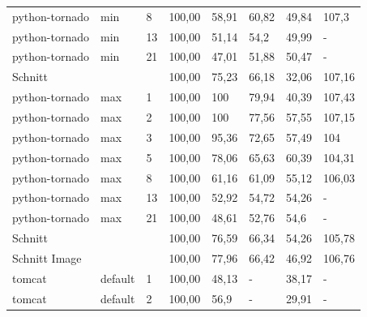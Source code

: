 \begin{footnotesize}
\begin{longtable}{llllllll}
		python-tornado & min     & 8          & 100,00 & 58,91                       & 60,82                          & 49,84  & 107,3  \\
		python-tornado & min     & 13         & 100,00 & 51,14                       & 54,2                           & 49,99  & -      \\
		python-tornado & min     & 21         & 100,00 & 47,01                       & 51,88                          & 50,47  & -      \\ \hline
		Schnitt        &         &            & 100,00 & 75,23                       & 66,18                          & 32,06  & 107,16 \\ \hline
		python-tornado & max     & 1          & 100,00 & \cellcolor[HTML]{C0C0C0}100 & 79,94                          & 40,39  & 107,43 \\
		python-tornado & max     & 2          & 100,00 & \cellcolor[HTML]{C0C0C0}100 & 77,56                          & 57,55  & 107,15 \\
		python-tornado & max     & 3          & 100,00 & 95,36                       & 72,65                          & 57,49  & 104    \\
		python-tornado & max     & 5          & 100,00 & 78,06                       & 65,63                          & 60,39  & 104,31 \\
		python-tornado & max     & 8          & 100,00 & 61,16                       & 61,09                          & 55,12  & 106,03 \\
		python-tornado & max     & 13         & 100,00 & 52,92                       & 54,72                          & 54,26  & -      \\
		python-tornado & max     & 21         & 100,00 & 48,61                       & 52,76                          & 54,6   & -      \\ \hline
		Schnitt        &         &            & 100,00 & 76,59                       & 66,34                          & 54,26  & 105,78 \\ \hline
		Schnitt Image  &         &            & 100,00 & 77,96                       & 66,42                          & 46,92  & 106,76 \\ \hline
		tomcat         & default & 1          & 100,00 & 48,13                       & -                              & 38,17  & -      \\
		tomcat         & default & 2          & 100,00 & 56,9                        & -                              & 29,91  & -      \\

\end{longtable}
\end{footnotesize}
